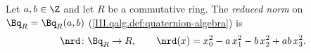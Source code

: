 Let $a,b\in\Z$ and let $R$ be a commutative ring. The \emph{reduced norm} on $\Bq_R=\Bq_R(a,b)$ (\cref{III.qalg.def:quaternion-algebra}) is
\[
  \nrd\colon\Bq_R\to R,\qquad \nrd(x)=x_0^2-a\,x_1^2-b\,x_2^2+ab\,x_3^2.
\]
